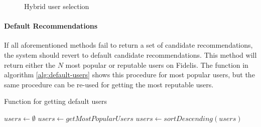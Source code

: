 \begin{figure}[H]
\centering
{}
\caption{Hybrid user selection}
\label{fig:hybrid}
\end{figure}

\paragraph{Default Recommendations}
If all aforementioned methods fail to return a set of candidate recommendations, the system should revert to default candidate recommendations. This method will return either the $N$ most popular or reputable users on Fidelis. The function in algorithm \ref{alg:default-users} shows this procedure for most popular users, but the same procedure can be re-used for getting the most reputable users.

\begin{algorithm}[H]
\caption{Function for getting default users}
\label{alg:default-users}
\begin{algorithmic}[1]
    \State $users\gets \emptyset$
    \State $users\gets getMostPopularUsers$
    \State $users\gets sortDescending(users)$
    \State {}
\EndFunction
\end{algorithmic}
\end{algorithm}

